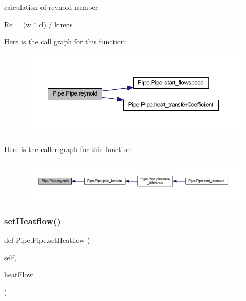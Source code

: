 \begin{DoxyVerb}calculation of reynold number

Re = (w * d) / kinvis
\end{DoxyVerb}
 Here is the call graph for this function\+:
\nopagebreak
\begin{figure}[H]
\begin{center}
\leavevmode
\includegraphics[width=350pt]{class_pipe_1_1_pipe_afec35167b5ad4acf26ea2db36292d135_cgraph}
\end{center}
\end{figure}
Here is the caller graph for this function\+:
\nopagebreak
\begin{figure}[H]
\begin{center}
\leavevmode
\includegraphics[width=350pt]{class_pipe_1_1_pipe_afec35167b5ad4acf26ea2db36292d135_icgraph}
\end{center}
\end{figure}
\mbox{\label{class_pipe_1_1_pipe_a628661bc972aee1bc2f84623fcfaed91}} 
\subsubsection{\texorpdfstring{set\+Heatflow()}{setHeatflow()}}
{\footnotesize\ttfamily def Pipe.\+Pipe.\+set\+Heatflow (\begin{DoxyParamCaption}\item[{}]{self,  }\item[{}]{heat\+Flow }\end{DoxyParamCaption})}

\mbox{\label{class_pipe_1_1_pipe_a184f926c3aee89e94c19b003d6cc9416}} 
